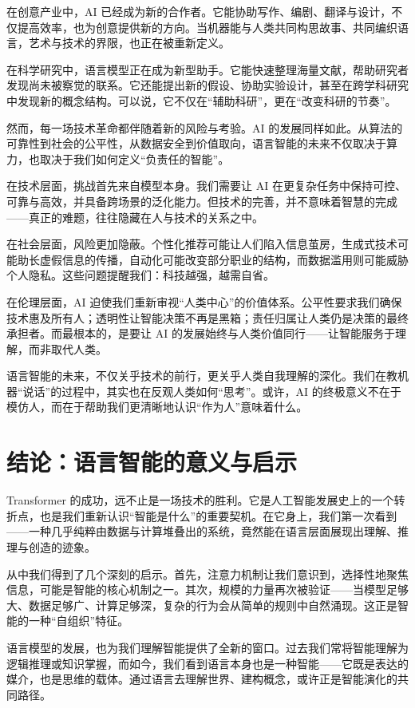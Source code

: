 在创意产业中，AI 已经成为新的合作者。它能协助写作、编剧、翻译与设计，不仅提高效率，也为创意提供新的方向。当机器能与人类共同构思故事、共同编织语言，艺术与技术的界限，也正在被重新定义。

在科学研究中，语言模型正在成为新型助手。它能快速整理海量文献，帮助研究者发现尚未被察觉的联系。它还能提出新的假设、协助实验设计，甚至在跨学科研究中发现新的概念结构。可以说，它不仅在“辅助科研”，更在“改变科研的节奏”。

然而，每一场技术革命都伴随着新的风险与考验。AI 的发展同样如此。从算法的可靠性到社会的公平性，从数据安全到价值取向，语言智能的未来不仅取决于算力，也取决于我们如何定义“负责任的智能”。

在技术层面，挑战首先来自模型本身。我们需要让 AI 在更复杂任务中保持可控、可靠与高效，并具备跨场景的泛化能力。但技术的完善，并不意味着智慧的完成——真正的难题，往往隐藏在人与技术的关系之中。

在社会层面，风险更加隐蔽。个性化推荐可能让人们陷入信息茧房，生成式技术可能助长虚假信息的传播，自动化可能改变部分职业的结构，而数据滥用则可能威胁个人隐私。这些问题提醒我们：科技越强，越需自省。

在伦理层面，AI 迫使我们重新审视“人类中心”的价值体系。公平性要求我们确保技术惠及所有人；透明性让智能决策不再是黑箱；责任归属让人类仍是决策的最终承担者。而最根本的，是要让 AI 的发展始终与人类价值同行——让智能服务于理解，而非取代人类。

语言智能的未来，不仅关乎技术的前行，更关乎人类自我理解的深化。我们在教机器“说话”的过程中，其实也在反观人类如何“思考”。或许，AI 的终极意义不在于模仿人，而在于帮助我们更清晰地认识“作为人”意味着什么。

\section{结论：语言智能的意义与启示}

Transformer 的成功，远不止是一场技术的胜利。它是人工智能发展史上的一个转折点，也是我们重新认识“智能是什么”的重要契机。在它身上，我们第一次看到——一种几乎纯粹由数据与计算堆叠出的系统，竟然能在语言层面展现出理解、推理与创造的迹象。

从中我们得到了几个深刻的启示。首先，注意力机制让我们意识到，选择性地聚焦信息，可能是智能的核心机制之一。其次，规模的力量再次被验证——当模型足够大、数据足够广、计算足够深，复杂的行为会从简单的规则中自然涌现。这正是智能的一种“自组织”特征。

语言模型的发展，也为我们理解智能提供了全新的窗口。过去我们常将智能理解为逻辑推理或知识掌握，而如今，我们看到语言本身也是一种智能——它既是表达的媒介，也是思维的载体。通过语言去理解世界、建构概念，或许正是智能演化的共同路径。


